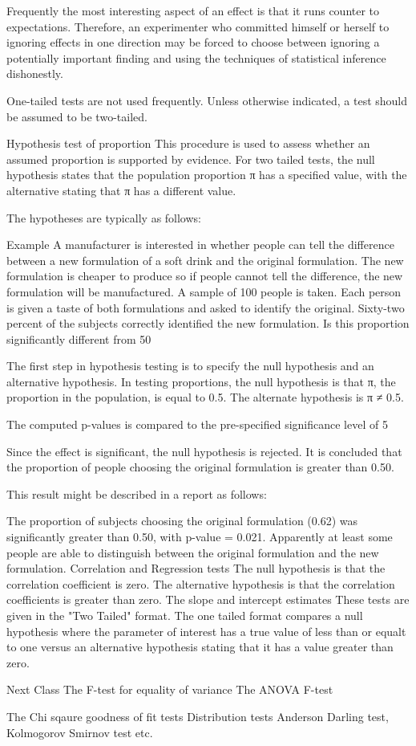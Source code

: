 Frequently the most interesting aspect of an effect is that it runs counter to expectations. Therefore, an experimenter who committed himself or herself to ignoring effects in one direction may be forced to choose between ignoring a potentially important finding and using the techniques of statistical inference dishonestly. 
 
One-tailed tests are not used frequently. Unless otherwise indicated, a test should be assumed to be two-tailed. 
 



 
 
Hypothesis test of proportion
This procedure is used to assess whether an assumed proportion is supported by evidence. For two tailed tests, the null hypothesis states that the population proportion  π has a specified value, with the alternative stating that π has a different value.
 
The hypotheses are typically as follows: 
 
Example
A manufacturer is interested in whether people can tell the difference between a new formulation of a soft drink and the original formulation. The new formulation is cheaper to produce so if people cannot tell the difference, the new formulation will be manufactured. A sample of 100 people is taken. Each person is given a taste of both formulations and asked to identify the original. Sixty-two percent of the subjects correctly identified the new formulation. Is this proportion significantly different from 50%
 
The first step in hypothesis testing is to specify the null hypothesis and an alternative hypothesis. In testing proportions, the null hypothesis is that π, the proportion in the population, is equal to 0.5. The alternate hypothesis is π ≠ 0.5.
 
The computed p-values is compared to the pre-specified significance level of 5%
 
Since the effect is significant, the null hypothesis is rejected. It is concluded that the proportion of people choosing the original formulation is greater than 0.50.
 
This result might be described in a report as follows:
 
	The proportion of subjects choosing the original formulation (0.62) was significantly greater than 0.50, with p-value = 0.021. 
	Apparently at least some people are able to distinguish between the original formulation and the new formulation.
Correlation  and Regression tests
The null hypothesis is that the correlation coefficient is zero.
The alternative hypothesis is that the correlation coefficients is greater than zero.
The slope and intercept estimates
These tests are given in the "Two Tailed" format.
The one tailed format compares a null hypothesis where the parameter of interest has a true value of less than or equalt to one
versus an alternative hypothesis stating that it has a value greater than zero.

 

Next Class
The F-test for equality of variance
The ANOVA F-test
 

The Chi sqaure goodness of fit tests
Distribution tests
	Anderson Darling test, Kolmogorov Smirnov test etc.
 
 
